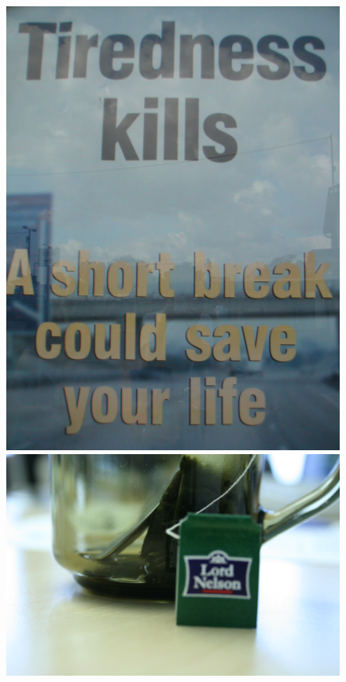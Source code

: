 \begin{figure}[h!]
    	\includegraphics[height=0.172\textheight]{related_work/figs/icdar13_img_1.jpg}
    	\includegraphics[height=0.172\textheight]{dataset_samples/icdar13/img_16.jpg}

\end{figure}
